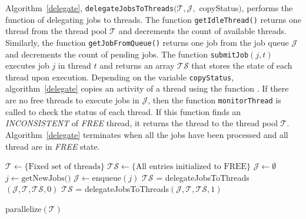 \documentclass{article}
\begin{document}
Algorithm~\ref{delegate}, \texttt{delegateJobsToThreads}$(\mathcal{T}, \mathcal{J},$ copyStatus$)$, 
performs the function of delegating jobs to threads. The function \texttt{getIdleThread()} returns  
one thread from the thread pool $\mathcal{T}$ and decrements the count of available threads. 
Similarly, the function \texttt{getJobFromQueue()} returns one job from the job queue $\mathcal{J}$ 
and decrements the count of pending jobs. The function \texttt{submitJob$(j,t)$} executes job $j$ 
in thread $t$ and returns an array $\mathcal{TS}$ that stores the state of each thread upon execution. 
Depending on the variable \texttt{copyStatus}, algorithm~\ref{delegate} copies an activity of a 
thread using the function .  If there are no free threads to execute jobs 
in $\mathcal{J}$, then the function \texttt{monitorThread} is called to check the status of each thread. 
If this function finds an \emph{INCONSISTENT} of \emph{FREE} thread, it returns the thread to the thread 
pool $\mathcal{T}$.  Algorithm~\ref{delegate} terminates when all the jobs have been processed and all 
thread are in \emph{FREE} state. 
%
%
%
\begin{algorithm2e}[t]
\DontPrintSemicolon
{}
\begin{small}
	$\mathcal{T} \leftarrow \{\text{Fixed set of threads}\}$ \;
	$\mathcal{TS} \leftarrow \{\text{All entries initialized to FREE}\}$ \;
	$\mathcal{J} \leftarrow \emptyset$ \;
	 {
	  $j \leftarrow \text{getNewJobs()}$ \;
	  $\mathcal{J} \leftarrow \text{enqueue}(j)$ \;
	  {
		  $\mathcal{TS}$ = delegateJobsToThreads$(\mathcal{J}, \mathcal{T}, \mathcal{TS}, 0)$ \;
	  }
	  \Else 
	  {
		  $\mathcal{TS}$ = delegateJobsToThreads$(\mathcal{J}, \mathcal{T}, \mathcal{TS}, 1)$ \;
	  }
        }
           \continue
	\return \;
\end{small}
	\caption{parallelize$(\mathcal{T})$
	\label{scheduler}}
\end{algorithm2e}
\end{document}

